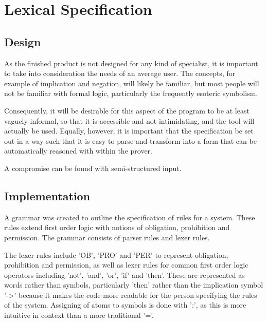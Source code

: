 \documentclass{l4proj}
\begin{document}

\section{Lexical Specification}


\subsection{Design}
As the finished product is not designed for any kind of specialist, it is important to take into consideration the needs of an average user. The concepts, for example of implication and negation, will likely be familiar, but most people will not be familiar with formal logic, particularly the frequently esoteric symbolism. 

Consequently, it will be desirable for this aspect of the program to be at least vaguely informal, so that it is accessible and not intimidating, and the tool will actually be used. Equally, however, it is important that the specification be set out in a way such that it is easy to parse and transform into a form that can be automatically reasoned with within the prover. 

A compromise can be found with semi-structured input. 



\subsection{Implementation}
A grammar was created to outline the specification of rules for a system. These rules extend first order logic with notions of obligation, prohibition and permission. The grammar consists of parser rules and lexer rules. 

The lexer rules include 'OB', 'PRO' and 'PER' to represent obligation, prohibition and permission, as well as lexer rules for common first order logic operators including 'not', 'and', 'or', 'if' and 'then'. These are represented as words rather than symbols, particularly 'then' rather than the implication symbol '->' because it makes the code more readable for the person specifying the rules of the system. Assigning of atoms to symbols is done with ':', as this is more intuitive in context than a more traditional '='. 
\end{document}
